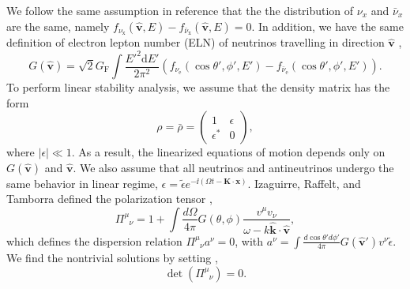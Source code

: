 We follow the same assumption in reference \cite{Izaguirre2016a} that the the distribution of $\nu_x$ and $\bar\nu_x$ are the same, namely $ f_{\nu_{\mathrm x}}(\hat{\mathbf v},E)  - f_{\bar\nu_{\mathrm x}}(\hat{\mathbf v},E)=0$. In addition, we have the same definition of electron lepton number (ELN) of neutrinos travelling in direction $\hat{\mathbf v}$ \cite{Izaguirre2016a},
\begin{equation}
G(\hat{\mathbf v}) =  \sqrt{2}G_{\mathrm F} \int \frac{E'^2 \mathrm d E'}{2\pi^2} ( f_{\nu_{\mathrm e}}(\cos\theta',\phi',E')  - f_{\bar\nu_{\mathrm e}}(\cos\theta',\phi',E')  ).
\end{equation}
To perform linear stability analysis, we assume that the density matrix has the form
\begin{equation}
\rho = \bar \rho = \begin{pmatrix}
1 & \epsilon \\
\epsilon^* & 0
\end{pmatrix},
\end{equation}
where $\lvert \epsilon \rvert \ll 1$. As a result, the linearized equations of motion depends only on $G(\hat{\mathbf v})$ and $\hat{\mathbf v}$. We also assume that all neutrinos and antineutrinos undergo the same behavior in linear regime, $\epsilon = \tilde\epsilon e^{-\ii (\Omega t - \mathbf K\cdot \mathbf x)}$. Izaguirre, Raffelt, and Tamborra defined the polarization tensor \cite{Izaguirre2016a},
\begin{equation}
\Pi^\mu_{\phantom{\mu}\nu} = 1 + \int \frac{d\Omega}{4\pi} G(\theta,\phi) \frac{v^\mu v_\nu}{\omega- k \hat{\mathbf k}\cdot \hat{\mathbf v} },
\end{equation}
which defines the dispersion relation $\Pi^\mu_{\phantom{\mu}\nu} a^\nu = 0$, with $a^\nu = \int \frac{d\cos\theta' d\phi'}{4\pi} G(\hat{\mathbf v}') v^\nu \tilde\epsilon$. We find the nontrivial solutions by setting \cite{Izaguirre2016a},
\begin{equation}
\operatorname{det}\left( \Pi^\mu_{\phantom{\mu}\nu} \right) = 0.
\label{eqn-dr-determinant-equation}
\end{equation}


